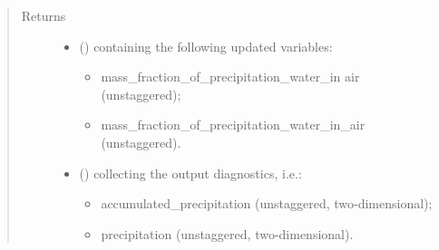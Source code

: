 \documentclass[letterpaper,10pt,english]{sphinxmanual}
\begin{document}
\begin{fulllineitems}
\begin{fulllineitems}
\begin{quote}
\begin{description}
\begin{itemize}
\begin{itemize}
\end{itemize}


\end{itemize}

\item[{Returns}] \leavevmode
\begin{itemize}
\item {} 
 () \textendash{} {\hyperref[\detokenize{api:tasmania.storages.state_isentropic.StateIsentropic}]{}} containing the following updated variables:
\begin{itemize}
\item {} 
mass\_fraction\_of\_precipitation\_water\_in air (unstaggered);

\item {} 
mass\_fraction\_of\_precipitation\_water\_in\_air (unstaggered).

\end{itemize}

\item {} 
 () \textendash{} {\hyperref[\detokenize{api:tasmania.storages.grid_data.GridData}]{}} collecting the output diagnostics, i.e.:
\begin{itemize}
\item {} 
accumulated\_precipitation (unstaggered, two-dimensional);

\item {} 
precipitation (unstaggered, two-dimensional).

\end{itemize}

\end{itemize}


\end{description}\end{quote}

\end{fulllineitems}



\end{fulllineitems}
\end{document}
